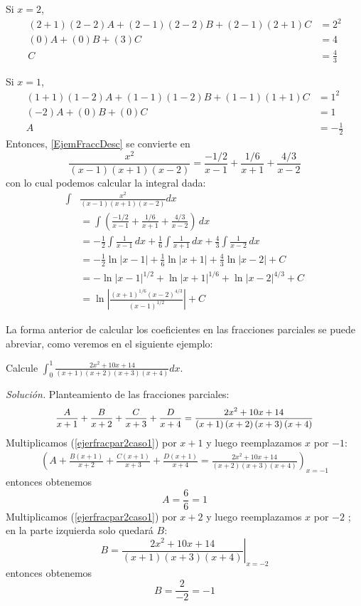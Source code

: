 Si $x=2$,
\begin{align*}
  (2+1)(2-2)A+(2-1)(2-2)B+(2-1)(2+1)C&=2^{2} \\
  (0)A+(0)B+(3)C&=4 \\
  C&=\frac{4}{3}
\end{align*}

Si $x=1$,
\begin{align*}
  (1+1)(1-2)A+(1-1)(1-2)B+(1-1)(1+1)C&=1^{2} \\
  (-2)A+(0)B+(0)C&=1 \\
  A&=-\frac{1}{2}
\end{align*}
Entonces, \eqref{EjemFraccDesc} se convierte en
\[
  \frac{x^{2}}{(x-1)(x+1)(x-2)}=\frac{-1/2}{x-1}+\frac{1/6}{x+1}+\frac{4/3}{x-2}
\]
con lo cual podemos calcular la integral dada:
\begin{align*}
  \int &\frac{x^{2}}{(x-1)(x+1)(x-2)}dx\\
  &=\int\left( \frac{-1/2}{x-1}+\frac{1/6}{x+1}+\frac{4/3}{x-2}\right)\, dx \\
  &=-\frac{1}{2}\int \frac{1}{x-1}\, dx + \frac{1}{6}\int\frac{1}{x+1}\, dx +\frac{4}{3}\int\frac{1}{x-2}\, dx \\
  &=-\frac{1}{2}\ln\vert x-1 \vert+\frac{1}{6}\ln\vert x+1 \vert+\frac{4}{3}\ln\vert x-2\vert+C \\
  &=-\ln\vert x-1 \vert^{1/2}+\ln\vert x+1 \vert^{1/6}+\ln\vert x-2\vert^{4/3}+C \\
  &=\ln\left\vert\frac{(x+1)^{1/6}(x-2)^{4/3}}{(x-1)^{1/2}} \right\vert+C
\end{align*}

La forma anterior de calcular los coeficientes en las fracciones parciales
se puede abreviar, como veremos en el siguiente ejemplo:

\begin{ejemplo}
  Calcule $\int_{0}^{1}\frac{2x^{2}+10x+14}{\left( x+1\right) \left(
  x+2\right) \left( x+3\right) \left( x+4\right) }dx$.
\end{ejemplo}
\emph{Solución.} Planteamiento de las fracciones parciales:
\begin{equation}\label{ejerfracpar2caso1}
  \text{\small$\displaystyle
    \frac{A}{x+1}+\frac{B}{x+2}+\frac{C}{x+3}+\frac{D}{x+4}=\frac{2x^{2}+10x+14}{\left( x+1\right) \left( x+2\right) \left( x+3\right) \left(x+4\right)}
  $}
\end{equation}
Multiplicamos (\ref{ejerfracpar2caso1}) por $x+1$ y luego reemplazamos $x$ por $-1$:
\begin{gather*}
  \left( A+\frac{B\left( x+1\right) }{x+2}+\frac{C\left( x+1\right) }{x+3}+%
    \frac{D\left( x+1\right) }{x+4}=\frac{2x^{2}+10x+14}{\left( x+2\right)
  \left( x+3\right) \left( x+4\right) }\right) _{x=-1}
\end{gather*}
entonces obtenemos
$$A=\frac{6}{6}=1$$
Multiplicamos (\ref{ejerfracpar2caso1}) por $x+2$ y luego reemplazamos $x$ por $-2$%
; en la parte izquierda solo quedará $B$:
\[
  B=\left. \frac{2x^{2}+10x+14}{\left( x+1\right) \left( x+3\right) \left(
  x+4\right) }\right\vert _{x=-2}
\]
entonces obtenemos \[B=\frac{2}{-2}=-1\]

